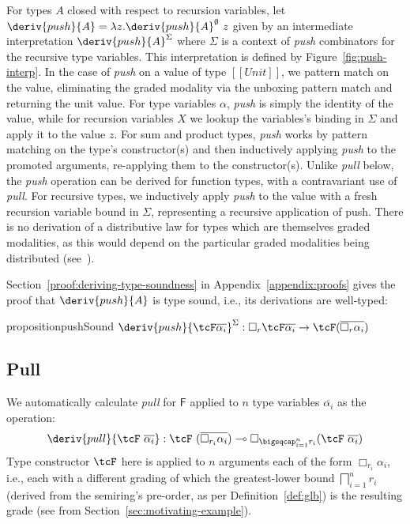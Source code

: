 For types $A$ closed with respect to recursion variables, let $\deriv{push}{A} =
\lambda z . \deriv{push}{A}^\emptyset\ z$ given by an intermediate
interpretation $\deriv{push}{A}^\Sigma$ where $\Sigma$ is a context of
\textit{push} combinators for the recursive type variables. This interpretation
is defined by Figure~\ref{fig:push-interp}.
%
In the case of \emph{push} on a value of type $[[ Unit ]]$, we pattern match on
the value, eliminating the graded modality via the unboxing pattern match and
returning the unit value. For type variables $\alpha$, \emph{push} is simply the
identity of the value, while for recursion variables $X$ we lookup the
variables's binding in $\Sigma$ and apply it to the value $z$. For sum and
product types, \emph{push} works by pattern matching on the type's
constructor(s) and then inductively applying \emph{push} to the promoted
arguments, re-applying them to the constructor(s). Unlike \emph{pull} below, the
\emph{push} operation can be derived for function types, with a contravariant
use of \emph{pull}. For recursive types, we inductively apply \emph{push} to the
value with a fresh recursion variable bound in $\Sigma$, representing a
recursive application of push. There is no derivation of a distributive law for
types which are themselves graded modalities, as this would depend on the
particular graded modalities being distributed
(see~\citet{DBLP:conf/icfp/GaboardiKOBU16}). 

Section~\ref{proof:deriving-type-soundness} in Appendix~\ref{appendix:proofs}
gives the proof that $\deriv{push}{A}$ is type sound, i.e., its derivations are
well-typed: 

\begin{restatable}{proposition}{pushSound}
\label{prop:soundness-push}
$\deriv{push}{\tcF \overline{\alpha_i}}^{\Sigma} : \Box_{r} \tcF \overline{\alpha_i}
  \rightarrow  \tcF  (\overline{\Box_{r} \alpha_i})$
\end{restatable}

\subsection{Pull}
We automatically
calculate \emph{pull} for $\mathsf{F}$
applied to $n$ type variables
$\overline{\alpha_i}$
as the operation:
\begin{align*}
\deriv{pull}{\tcF\ \overline{\alpha_i}} : \tcF\ (\overline{\Box_{r_i} \alpha_i})
\multimap \Box_{\bigsqcap^n_{i = 1} r_i} (\tcF\  \overline{\alpha_i})
 \end{align*}
Type constructor $\tcF$ here is applied to $n$ arguments each of the form
$\Box_{r_i} \alpha_i$, i.e., each with a different grading of which the
greatest-lower bound $\bigsqcap^n_{i = 1} r_i$ (derived from the semiring's
pre-order, as per Definition~\ref{def:glb}) is the resulting grade (see  from
Section~\ref{sec:motivating-example}).

